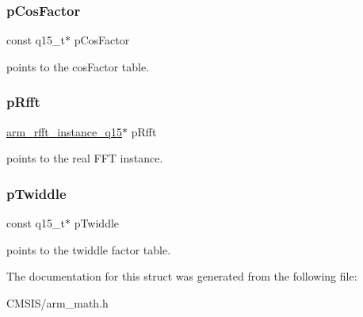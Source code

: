 \subsubsection{\texorpdfstring{pCosFactor}{pCosFactor}}
{\footnotesize\ttfamily const q15\+\_\+t$\ast$ p\+Cos\+Factor}

points to the cos\+Factor table. \mbox{\label{structarm__dct4__instance__q15_aea6aa42c838f2b22c8c31e9e259b8d75}} 
\subsubsection{\texorpdfstring{pRfft}{pRfft}}
{\footnotesize\ttfamily \mbox{\hyperlink{structarm__rfft__instance__q15}{arm\+\_\+rfft\+\_\+instance\+\_\+q15}}$\ast$ p\+Rfft}

points to the real F\+FT instance. \mbox{\label{structarm__dct4__instance__q15_a7f19217cfa0370f9e518caa882265386}} 
\subsubsection{\texorpdfstring{pTwiddle}{pTwiddle}}
{\footnotesize\ttfamily const q15\+\_\+t$\ast$ p\+Twiddle}

points to the twiddle factor table. 

The documentation for this struct was generated from the following file\+:\begin{DoxyCompactItemize}
\item 
C\+M\+S\+I\+S/arm\+\_\+math.\+h\end{DoxyCompactItemize}
